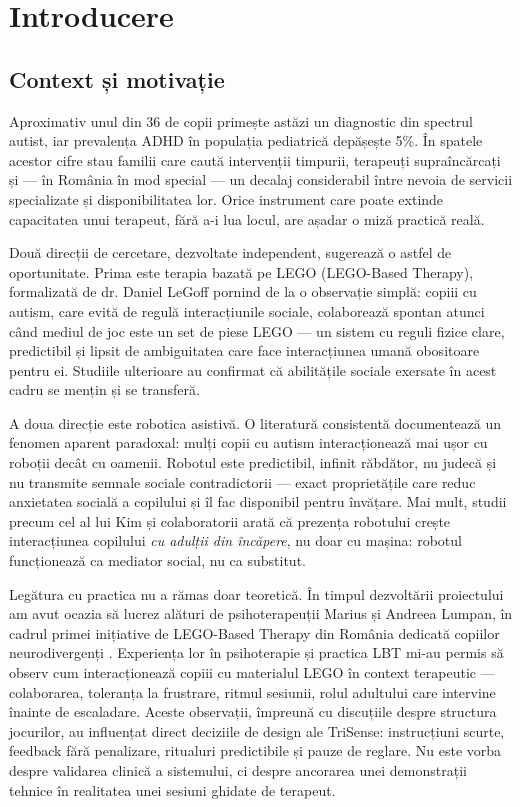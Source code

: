 \chapter{Introducere}
\label{cap:introducere}

\section{Context și motivație}

Aproximativ unul din 36 de copii primește astăzi un diagnostic din spectrul autist, iar prevalența ADHD în populația pediatrică depășește 5\%. În spatele acestor cifre stau familii care caută intervenții timpurii, terapeuți supraîncărcați și — în România în mod special — un decalaj considerabil între nevoia de servicii specializate și disponibilitatea lor. Orice instrument care poate extinde capacitatea unui terapeut, fără a-i lua locul, are așadar o miză practică reală.

Două direcții de cercetare, dezvoltate independent, sugerează o astfel de oportunitate. Prima este terapia bazată pe LEGO (LEGO-Based Therapy), formalizată de dr. Daniel LeGoff \cite{legoff2004} pornind de la o observație simplă: copiii cu autism, care evită de regulă interacțiunile sociale, colaborează spontan atunci când mediul de joc este un set de piese LEGO — un sistem cu reguli fizice clare, predictibil și lipsit de ambiguitatea care face interacțiunea umană obositoare pentru ei. Studiile ulterioare \cite{legoff2006, owens2008} au confirmat că abilitățile sociale exersate în acest cadru se mențin și se transferă.

A doua direcție este robotica asistivă. O literatură consistentă \cite{scassellati2012, robins2005, cabibihan2013} documentează un fenomen aparent paradoxal: mulți copii cu autism interacționează mai ușor cu roboții decât cu oamenii. Robotul este predictibil, infinit răbdător, nu judecă și nu transmite semnale sociale contradictorii — exact proprietățile care reduc anxietatea socială a copilului și îl fac disponibil pentru învățare. Mai mult, studii precum cel al lui Kim și colaboratorii \cite{kim2013} arată că prezența robotului crește interacțiunea copilului \emph{cu adulții din încăpere}, nu doar cu mașina: robotul funcționează ca mediator social, nu ca substitut.

Legătura cu practica nu a rămas doar teoretică. În timpul dezvoltării proiectului am avut ocazia să lucrez alături de psihoterapeuții Marius și Andreea Lumpan, în cadrul primei inițiative de LEGO-Based Therapy din România dedicată copiilor neurodivergenți \cite{lumpanagerpres2025}. Experiența lor în psihoterapie și practica LBT mi-au permis să observ cum interacționează copiii cu materialul LEGO în context terapeutic — colaborarea, toleranța la frustrare, ritmul sesiunii, rolul adultului care intervine înainte de escaladare. Aceste observații, împreună cu discuțiile despre structura jocurilor, au influențat direct deciziile de design ale TriSense: instrucțiuni scurte, feedback fără penalizare, ritualuri predictibile și pauze de reglare. Nu este vorba despre validarea clinică a sistemului, ci despre ancorarea unei demonstrații tehnice în realitatea unei sesiuni ghidate de terapeut.


